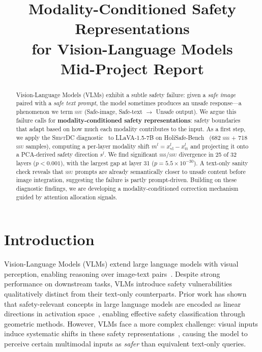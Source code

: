 \documentclass{article}
\title{Modality-Conditioned Safety Representations\\for Vision-Language Models\\[4pt]
       \large Mid-Project Report}
\author{%
}
\newcommand{\ShiftDC}{\textsc{ShiftDC}}
\newcommand{\xvl}{x_{\text{vl}}}
\newcommand{\xtt}{x_{\text{tt}}}
\newcommand{\ml}{m^l}
\newcommand{\safel}{s^l}
\begin{document}
\maketitle

\begin{abstract}
Vision-Language Models (VLMs) exhibit a subtle safety failure: given a \emph{safe image}
paired with a \emph{safe text prompt}, the model sometimes produces an unsafe response---a
phenomenon we term \textsc{ssu} (Safe-image, Safe-text $\rightarrow$ Unsafe output).
We argue this failure calls for \textbf{modality-conditioned safety representations}: safety
boundaries that adapt based on how much each modality contributes to the input.
As a first step, we apply the \ShiftDC{} diagnostic~\cite{zou2025shiftdc} to LLaVA-1.5-7B
on HoliSafe-Bench~\cite{lee2025holisafe} (682 \textsc{sss} + 718 \textsc{ssu} samples),
computing a per-layer modality shift $\ml = \xvl^l - \xtt^l$ and projecting it onto a
PCA-derived safety direction $\safel$.
We find significant \textsc{sss}/\textsc{ssu} divergence in 25 of 32 layers ($p < 0.001$),
with the largest gap at layer 31 ($p = 5.5\times10^{-30}$).
A text-only sanity check reveals that \textsc{ssu} prompts are already semantically closer
to unsafe content before image integration, suggesting the failure is partly prompt-driven.
Building on these diagnostic findings, we are developing a modality-conditioned correction
mechanism guided by attention allocation signals.
\end{abstract}

\section{Introduction}

Vision-Language Models (VLMs) extend large language models with visual perception, enabling
reasoning over image-text pairs~\cite{liu2024llava15}.
Despite strong performance on downstream tasks, VLMs introduce safety vulnerabilities
qualitatively distinct from their text-only counterparts.
Prior work has shown that safety-relevant concepts in large language models are encoded as
linear directions in activation space~\cite{arditi2024refusal}, enabling effective safety classification through geometric methods.
However, VLMs face a more complex challenge: visual inputs induce systematic shifts in these
safety representations~\cite{zou2025shiftdc}, causing the model to perceive certain
multimodal inputs as \emph{safer} than equivalent text-only queries.
\end{document}
